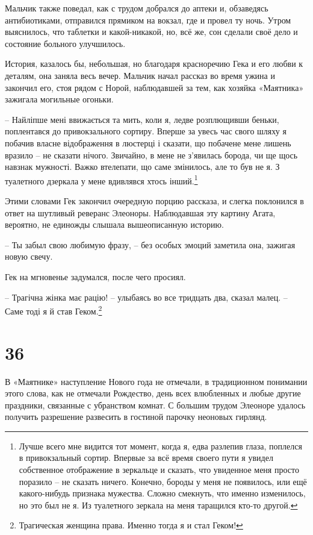 \documentclass[
  a5paperpaper,
  DIV=11,
  numbers=noendperiod]{scrreprt}
\begin{document}
Мальчик также поведал, как с трудом добрался до аптеки и, обзаведясь
антибиотиками, отправился прямиком на вокзал, где и провел ту ночь.
Утром выяснилось, что таблетки и какой-никакой, но, всё же, сон сделали
своё дело и состояние больного улучшилось.

История, казалось бы, небольшая, но благодаря красноречию Гека и его
любви к деталям, она заняла весь вечер. Мальчик начал рассказ во время
ужина и закончил его, стоя рядом с Норой, наблюдавшей за тем, как
хозяйка «Маятника» зажигала могильные огоньки.

-- Найліпше мені ввижається та мить, коли я, ледве розплющивши беньки,
поплентався до привокзального сортиру. Вперше за увесь час свого шляху я
побачив власне відображення в люстерці і сказати, що побачене мене
лишень вразило -- не сказати нічого. Звичайно, в мене не з'явилась
борода, чи ще щось навзнак мужності. Важко втелепати, що саме змінилось,
але то був не я. З туалетного дзеркала у мене вдивлявся хтось
інший.\footnote{Лучше всего мне видится тот момент, когда я, едва
  разлепив глаза, поплелся в привокзальный сортир. Впервые за всё время
  своего пути я увидел собственное отображение в зеркальце и сказать,
  что увиденное меня просто поразило -- не сказать ничего. Конечно,
  бороды у меня не появилось, или ещё какого-нибудь признака мужества.
  Сложно смекнуть, что именно изменилось, но это был не я. Из туалетного
  зеркала на меня таращился кто-то другой.}

Этими словами Гек закончил очередную порцию рассказа, и слегка
поклонился в ответ на шутливый реверанс Элеоноры. Наблюдавшая эту
картину Агата, вероятно, не единожды слышала вышеописанную историю.

-- Ты забыл свою любимую фразу, -- без особых эмоций заметила она,
зажигая новую свечу.

Гек на мгновенье задумался, после чего просиял.

-- Трагічна жінка має рацію! -- улыбаясь во все тридцать два, сказал
малец. -- Саме тоді я й став Геком.\footnote{Трагическая женщина права.
  Именно тогда я и стал Геком!}

\section*{36}\label{36}


В «Маятнике» наступление Нового года не отмечали, в традиционном
понимании этого слова, как не отмечали Рождество, день всех влюбленных и
любые другие праздники, связанные с убранством комнат. С большим трудом
Элеоноре удалось получить разрешение развесить в гостиной парочку
неоновых гирлянд.
\end{document}
